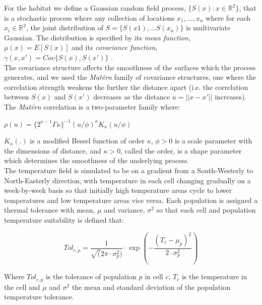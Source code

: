 \documentclass[review]{elsarticle}
\begin{document}
For the habitat we define a Gaussian random field process, $\{S(x) : x \in
\mathbb{R}^2\}$, that is a stochastic process where any collection of locations
$x_{1}, \dots, x_{n}$ where for each $x_{i} \in \mathbb{R}^2$, the joint
distribution of $S = \{S(x1),\dots S(x_{n})\}$ is multivariate Gaussian. The
distribution is specified by its \textit{mean function}, $\mu(x) = E[S(x)]$ and
its \textit{covariance function}, $\gamma(x,x') = Cov\{S(x),S(x')\}$
\citep{Diggle2007}.\\

The covariance structure affects the smoothness of the surfaces which the
process generates, and we used the \textit{Matérn} family of covariance
structures, one where the correlation strength weakens the further the distance
apart (i.e. the correlation between $S(x)$ and $S(x')$ decreases as the
distance $u = ||x - x'||$ increases).  The \textit{Matérn} correlation is a
two-parameter family where: \\

\begin{center}
	$\rho(u) = \{2^{\kappa -
		1}\Gamma{\kappa}\}^{-1}(u/\phi)^{\kappa}K_{\kappa}(u/\phi)$
\end{center}
	
$K_{\kappa}(.)$ is a modified Bessel function of order $\kappa$, $\phi >
0$ is a scale parameter with the dimensions of distance, and $\kappa > 0$,
called the order, is a shape parameter which determines the smoothness of the
underlying process. \\

The temperature field is simulated to be on a gradient from a South-Westerly to
North-Easterly direction, with temperature in each cell changing gradually on a
week-by-week basis so that initially high temperature areas cycle to lower
temperatures and low temperature areas vice versa. Each population is assigned
a thermal tolerance with mean, $\mu$ and variance, $\sigma^2$ so that each cell
and population temperature suitability is defined that:

\begin{equation}
	Tol_{c, p} = \frac{1}{ \sqrt (2\pi \cdot \sigma^2_{p})} \cdot \exp(-
		\frac{(T_{c} -
		\mu_{p})^2}{2 \cdot \sigma^2_{p}} )	
\end{equation}

Where $Tol_{c,p}$ is the tolerance of population $p$ in cell $c$, $T_{c}$ is
the temperature in the cell and $\mu$ and $\sigma^2$ the mean and standard
deviation of the population temperature tolerance. \\
\end{document}
